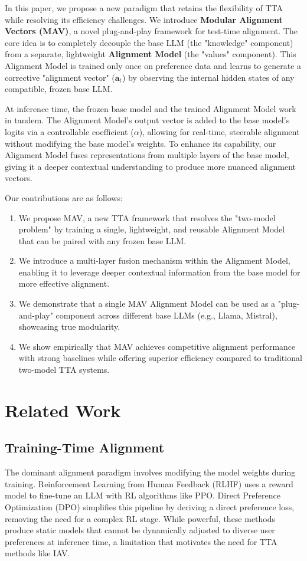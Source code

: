 \documentclass{article} %
\begin{document}
In this paper, we propose a new paradigm that retains the flexibility of TTA while resolving its efficiency challenges. We introduce \textbf{Modular Alignment Vectors (MAV)}, a novel plug-and-play framework for test-time alignment. The core idea is to completely decouple the base LLM (the "knowledge" component) from a separate, lightweight \textbf{Alignment Model} (the "values" component). This Alignment Model is trained only once on preference data and learns to generate a corrective "alignment vector" ($\mathbf{a}_t$) by observing the internal hidden states of any compatible, frozen base LLM.

At inference time, the frozen base model and the trained Alignment Model work in tandem. The Alignment Model's output vector is added to the base model's logits via a controllable coefficient ($\alpha$), allowing for real-time, steerable alignment without modifying the base model's weights. To enhance its capability, our Alignment Model fuses representations from multiple layers of the base model, giving it a deeper contextual understanding to produce more nuanced alignment vectors.

Our contributions are as follows:
\begin{enumerate}
    \item We propose MAV, a new TTA framework that resolves the "two-model problem" by training a single, lightweight, and reusable Alignment Model that can be paired with any frozen base LLM.
    \item We introduce a multi-layer fusion mechanism within the Alignment Model, enabling it to leverage deeper contextual information from the base model for more effective alignment.
    \item We demonstrate that a single MAV Alignment Model can be used as a "plug-and-play" component across different base LLMs (e.g., Llama, Mistral), showcasing true modularity.
    \item We show empirically that MAV achieves competitive alignment performance with strong baselines while offering superior efficiency compared to traditional two-model TTA systems.
\end{enumerate}
\section{Related Work}
\subsection{Training-Time Alignment}
The dominant alignment paradigm involves modifying the model weights during training. Reinforcement Learning from Human Feedback (RLHF) \citep{ouyang2022training} uses a reward model to fine-tune an LLM with RL algorithms like PPO. Direct Preference Optimization (DPO) \citep{rafailov2023direct} simplifies this pipeline by deriving a direct preference loss, removing the need for a complex RL stage. While powerful, these methods produce static models that cannot be dynamically adjusted to diverse user preferences at inference time, a limitation that motivates the need for TTA methods like IAV.
\end{document}
